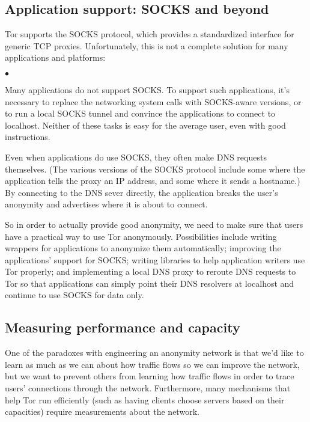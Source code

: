 \documentclass{llncs}
\newenvironment{tightlist}{\begin{list}{$\bullet$}{
  \setlength{\itemsep}{0mm}
    \setlength{\parsep}{0mm}
    }}{\end{list}}
\begin{document}

\subsection{Application support: SOCKS and beyond}

Tor supports the SOCKS protocol, which provides a standardized interface for
generic TCP proxies.  Unfortunately, this is not a complete solution for
many applications and platforms:
\begin{tightlist}
\item Many applications do not support SOCKS. To support such applications,
  it's necessary to replace the networking system calls with SOCKS-aware
  versions, or to run a local SOCKS tunnel and convince the applications to
  connect to localhost.  Neither of these tasks is easy for the average user,
  even with good instructions.
\item Even when applications do use SOCKS, they often make DNS requests
  themselves.  (The various versions of the SOCKS protocol include some where
  the application tells the proxy an IP address, and some where it sends a
  hostname.)  By connecting to the DNS sever directly, the application breaks
  the user's anonymity and advertises where it is about to connect.
\end{tightlist}

So in order to actually provide good anonymity, we need to make sure that
users have a practical way to use Tor anonymously.  Possibilities include
writing wrappers for applications to anonymize them automatically; improving
the applications' support for SOCKS; writing libraries to help application
writers use Tor properly; and implementing a local DNS proxy to reroute DNS
requests to Tor so that applications can simply point their DNS resolvers at
localhost and continue to use SOCKS for data only.

\subsection{Measuring performance and capacity}
One of the paradoxes with engineering an anonymity network is that we'd like
to learn as much as we can about how traffic flows so we can improve the
network, but we want to prevent others from learning how traffic flows in
order to trace users' connections through the network.  Furthermore, many
mechanisms that help Tor run efficiently (such as having clients choose servers
based on their capacities) require measurements about the network.
\end{document}
